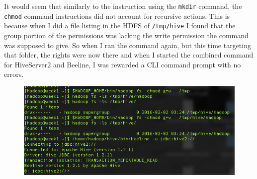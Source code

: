 \documentclass[10pt]{article}
\begin{document}
\indent It would seem that similarly to the instruction using the \verb|mkdir| command, the \verb|chmod| command instructions did not account for recursive actions. This is because when I did a file listing in the HDFS of \verb|/tmp/hive| I found that the group portion of the permissions was lacking the write permission the command was supposed to give. So when I ran the command again, but this time targeting that folder, the rights were now there and when I started the combined command for HiveServer2 and Beeline, I was rewarded a CLI command prompt with no errors.
\begin{figure}[!h]
\includegraphics[scale=0.37]{fix_perm.png}
\centering
\end{figure}\\
\end{document}
